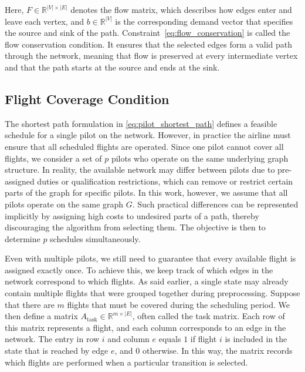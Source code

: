 \documentclass{book}
\theoremstyle{definition}
\newcounter{algorithm_}
\numberwithin{algorithm_}{chapter}
\begin{document}
{Here, $F \in \mathbb{R}^{|V| \times |E|}$ denotes the flow matrix, which describes how edges enter and leave each vertex, and $b \in \mathbb{R}^{|V|}$ is the corresponding demand vector that specifies the source and sink of the path. Constraint~\eqref{eq:flow_conservation} is called the flow conservation condition. It ensures that the selected edges form a valid path through the network, meaning that flow is preserved at every intermediate vertex and that the path starts at the source and ends at the sink.


\subsection{Flight Coverage Condition}

The shortest path formulation in \eqref{eq:pilot_shortest_path} defines a feasible schedule for a single pilot on the network. However, in practice the airline must ensure that all scheduled flights are operated. Since one pilot cannot cover all flights, we consider a set of $p$ pilots who operate on the same underlying graph structure.
In reality, the available network may differ between pilots due to pre-assigned duties or qualification restrictions, which can remove or restrict certain parts of the graph for specific pilots. In this work, however, we assume that all pilots operate on the same graph $G$. Such practical differences can be represented implicitly by assigning high costs to undesired parts of a path, thereby discouraging the algorithm from selecting them.
The objective is then to determine $p$ schedules simultaneously.

\bigskip

Even with multiple pilots, we still need to guarantee that every available flight is assigned exactly once. To achieve this, we keep track of which edges in the network correspond to which flights. As said earlier, a single state may already contain multiple flights that were grouped together during preprocessing. Suppose that there are $m$ flights that must be covered during the scheduling period. We then define a matrix $A_{\text{task}} \in \mathbb{R}^{m \times |E|}$, often called the task matrix. Each row of this matrix represents a flight, and each column corresponds to an edge in the network. The entry in row $i$ and column $e$ equals $1$ if flight $i$ is included in the state that is reached by edge $e$, and $0$ otherwise. In this way, the matrix records which flights are performed when a particular transition is selected.

}
\end{document}
